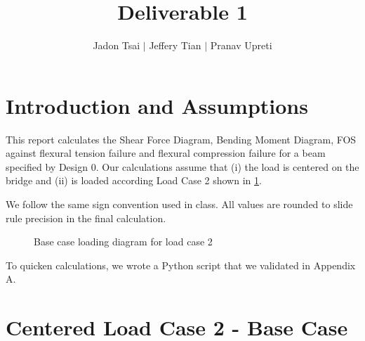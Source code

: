 \documentclass[11pt]{article}
\title{Deliverable 1}
\author{Jadon Tsai $|$ Jeffery Tian $|$ Pranav Upreti}
\begin{document}
\maketitle
\section{Introduction and Assumptions}
This report calculates the Shear Force Diagram, Bending Moment Diagram, FOS against flexural tension failure and flexural compression failure for a beam specified by Design 0. Our calculations assume that (i) the load is centered on the bridge and (ii) is loaded according Load Case 2 shown in \cref{fig:loadingDiagram}. 

We follow the same sign convention used in class. All values are rounded to slide rule precision in the final calculation. 
\begin{figure}[H]
\centering
{}
\caption{Base case loading diagram for load case 2}
\label{fig:loadingDiagram}
\end{figure}
To quicken calculations, we wrote a Python script that we validated in Appendix A. %
\section{Centered Load Case 2 - Base Case}
\end{document}
